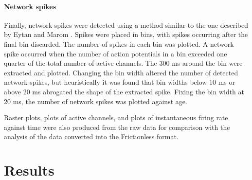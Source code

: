 \documentclass[10pt]{article}
\begin{document}
\paragraph{Network spikes} Finally, network spikes were detected using a method similar to the one described by Eytan and Marom \cite{eytan_dynamics_2006}. Spikes were placed in bins, with spikes occurring after the final bin discarded. The number of spikes in each bin was plotted. A network spike occurred when the number of action potentials in a bin exceeded one quarter of the total number of active channels. The 300 ms around the bin were extracted and plotted. Changing the bin width altered the number of detected network spikes, but heuristically it was found that bin widths below 10 ms or above 20 ms abrogated the shape of the extracted spike. Fixing the bin width at 20 ms, the number of network spikes was plotted against age.

\par Raster plots, plots of active channels, and plots of instantaneous firing rate against time were also produced from the raw data for comparison with the analysis of the data converted into the Frictionless format.

\section{Results}
\end{document}
